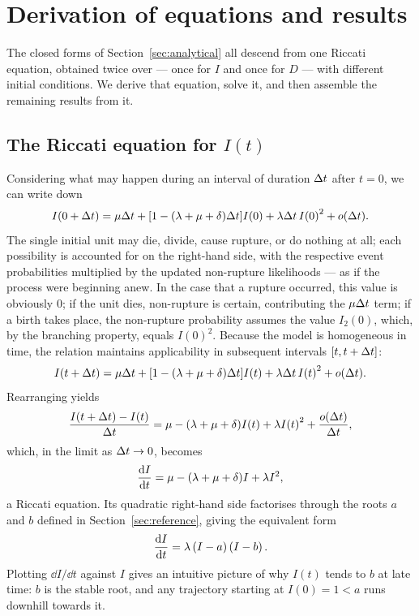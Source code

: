 \section{Derivation of equations and results}
\label{sec:derivations}

The closed forms of Section~\ref{sec:analytical} all descend from one Riccati
equation, obtained twice over --- once for $I$ and once for $D$ --- with
different initial conditions. We derive that equation, solve it, and then
assemble the remaining results from it.

\subsection{The Riccati equation for $I(t)$}

Considering what may happen during an interval of duration $\Delta t$ after
$t=0$, we can write down
$$I(0+\Delta t) = \mu \Delta t + [1 - (\lambda + \mu + \delta)\Delta t] I(0) + \lambda\Delta t\, {I(0)}^2 + o(\Delta t).$$
The single initial unit may die, divide, cause rupture, or do nothing at all;
each possibility is accounted for on the right-hand side, with the respective
event probabilities multiplied by the updated non-rupture likelihoods --- as if
the process were beginning anew. In the case that a rupture occurred, this value
is obviously $0$; if the unit dies, non-rupture is certain, contributing the
$\mu\Delta t$ term; if a birth takes place, the non-rupture probability assumes
the value $I_2(0)$, which, by the branching property, equals ${I(0)}^2$.
Because the model is homogeneous in time, the relation maintains applicability
in subsequent intervals $[t, t+\Delta t]$:
$$I(t+\Delta t) = \mu \Delta t + [1 - (\lambda + \mu + \delta)\Delta t] I(t) + \lambda\Delta t\, {I(t)}^2 + o(\Delta t).$$
Rearranging yields
$$\frac{I(t+\Delta t) -I(t)}{\Delta t} = \mu - (\lambda + \mu + \delta) I(t) + \lambda {I(t)}^2 + \frac{o(\Delta t)}{\Delta t},$$
which, in the limit as $\Delta t\to 0$, becomes
\begin{equation}
\label{ddII}
\displaystyle\frac{{\rm d} I}{{\rm d} t} = \mu - (\lambda + \mu + \delta) I + \lambda {I}^2,
\end{equation}
a Riccati equation. Its quadratic right-hand side factorises through the roots
$a$ and $b$ defined in Section~\ref{sec:reference}, giving the equivalent form
\begin{equation}
\label{ddIIfact}
\displaystyle\frac{{\rm d} I}{{\rm d} t} =\lambda\left( I-a\right)\left( I-b\right).
\end{equation}
Plotting $\dd I/\dd t$ against $I$ gives an intuitive picture of why $I(t)$
tends to $b$ at late time: $b$ is the stable root, and any trajectory starting
at $I(0)=1<a$ runs downhill towards it.

